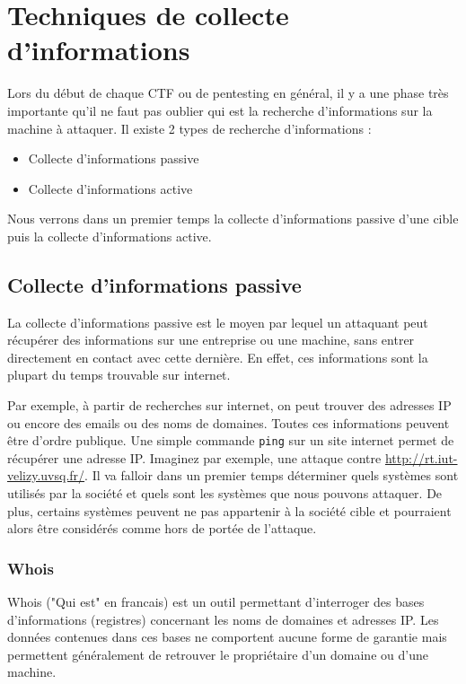 \chapter{Techniques de collecte d'informations}
\label{chap:Mini Projet}
Lors du début de chaque CTF ou de pentesting en général, il y a une phase très importante qu'il ne faut pas oublier qui est la recherche d'informations sur la machine à attaquer. Il existe 2 types de recherche d'informations :

\begin{itemize}
  \item Collecte d'informations passive
  \item Collecte d'informations active 
\end{itemize}

\noindent Nous verrons dans un premier temps la collecte d'informations passive d'une cible puis la collecte d'informations active.

\section{Collecte d'informations passive}

La collecte d'informations passive est le moyen par lequel un attaquant peut récupérer des informations sur une entreprise ou une machine, sans entrer directement en contact avec cette dernière. En effet, ces informations sont la plupart du temps trouvable sur internet.

\noident Par exemple, à partir de recherches sur internet, on peut trouver des adresses IP ou encore des emails ou des noms de domaines. Toutes ces informations peuvent être d'ordre publique. Une simple commande \lstinline{ping} sur un site internet permet de récupérer une adresse IP. Imaginez par exemple, une attaque contre \url{http://rt.iut-velizy.uvsq.fr/}. Il va falloir dans un premier temps déterminer quels systèmes sont utilisés par la société et quels sont les systèmes que nous pouvons attaquer. De plus, certains systèmes peuvent ne pas appartenir à la société cible et pourraient alors être considérés comme hors de portée de l'attaque.

\subsection{Whois}

Whois ("Qui est" en francais)  est un outil permettant d'interroger des bases d'informations (registres) concernant les noms de domaines et adresses IP. Les données contenues dans ces bases ne comportent aucune forme de garantie mais permettent généralement de retrouver le propriétaire d'un domaine ou d'une machine.

